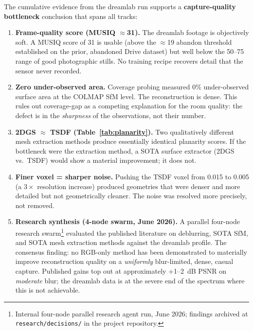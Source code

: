 The cumulative evidence from the dreamlab run supports a \textbf{capture-quality
bottleneck} conclusion that spans all tracks:

\begin{enumerate}
  \item \textbf{Frame-quality score (MUSIQ $\approx$31).}  The dreamlab footage is
        objectively soft.  A MUSIQ score of 31 is usable (above the $\approx$19 abandon
        threshold established on the prior, abandoned Drive dataset) but well below the
        50--75 range of good photographic stills.  No training recipe recovers detail that
        the sensor never recorded.

  \item \textbf{Zero under-observed area.}  Coverage probing measured 0\% under-observed
        surface area at the COLMAP SfM level.  The reconstruction is dense.  This rules
        out coverage-gap as a competing explanation for the room quality: the defect is in
        the \emph{sharpness} of the observations, not their number.

  \item \textbf{2DGS $\approx$ TSDF (Table~\ref{tab:planarity}).}  Two qualitatively
        different mesh extraction methods produce essentially identical planarity scores.
        If the bottleneck were the extraction method, a SOTA surface extractor
        (2DGS vs.\ TSDF) would show a material improvement; it does not.

  \item \textbf{Finer voxel = sharper noise.}  Pushing the TSDF voxel from 0.015 to
        0.005 (a $3\times$ resolution increase) produced geometries that were denser
        and more detailed but not geometrically cleaner.  The noise was resolved more
        precisely, not removed.

  \item \textbf{Research synthesis (4-node swarm, June 2026).}  A parallel four-node
        research swarm\footnote{Internal four-node parallel research agent run, June 2026; findings archived at \texttt{research/decisions/} in the project repository.} evaluated the published literature
        on deblurring, SOTA SfM, and SOTA mesh extraction methods against the dreamlab
        profile.  The consensus finding: no RGB-only method has been demonstrated to
        materially improve reconstruction quality on a \emph{uniformly} blur-limited,
        dense, casual capture.  Published gains top out at approximately +1--2~dB PSNR
        on \emph{moderate} blur; the dreamlab data is at the severe end of the spectrum
        where this is not achievable.
\end{enumerate}

